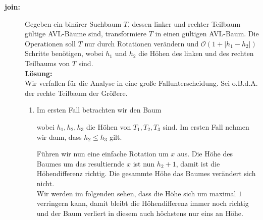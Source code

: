 \documentclass[11pt,a4paper,ngerman]{article}
\begin{document}
\begin{description}

\item[\bfseries join:] Gegeben ein binärer Suchbaum $T$, dessen linker und rechter Teilbaum gültige AVL-Bäume sind, transformiere $T$ in einen gültigen AVL-Baum. Die Operationen soll $T$ nur durch Rotationen verändern und $\mathcal{O}(1 + | h_1 - h_2|)$ Schritte benötigen, wobei $h_1$ und $h_2$ die Höhen des linken und des rechten Teilbaums von $T$ sind.\\

\noindent\textbf{Lösung:}\\

Wir verfallen für die Analyse in eine große Fallunterscheidung. Sei o.B.d.A. der rechte Teilbaum der Größere.

\begin{enumerate}[1. {Fall:}]
   \item Im ersten Fall betrachten wir den Baum 
      \begin{center}
      \end{center}
      wobei $h_1, h_2, h_3$ die Höhen von $T_1, T_2, T_3$ sind. Im ersten Fall nehmen wir dann, dass $h_2 \leq h_3$ gilt.
      
      Führen wir nun eine einfache Rotation um $x$ aus. Die Höhe des Baumes um das resultiernde $x$ ist nun $h_2 + 1$, damit ist die Höhendifferenz richtig.
      Die gesammte Höhe das Baumes verändert sich nicht.\\

      Wir werden im folgenden sehen, dass die Höhe sich um maximal $1$ verringern kann, damit bleibt die Höhendifferenz immer noch richtig und der Baum verliert in diesem auch 
      höchstens nur eins an Höhe.\\


\end{enumerate}
\end{description}
\end{document}
